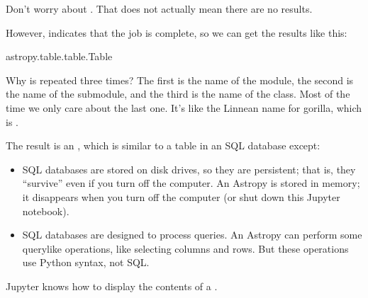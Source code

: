 \documentclass[letterpaper,10pt,english]{sphinxmanual}
\begin{document}
Don’t worry about .  That does not actually mean there are no results.

However,  indicates that the job is complete, so we can get the results like this:

\begin{sphinxVerbatim}[commandchars=\\\{\}]
  
\end{sphinxVerbatim}

\begin{sphinxVerbatim}[commandchars=\\\{\}]
astropy.table.table.Table
\end{sphinxVerbatim}

  Why is  repeated three times?  The first is the name of the module, the second is the name of the submodule, and the third is the name of the class.  Most of the time we only care about the last one.  It’s like the Linnean name for gorilla, which is .

The result is an , which is similar to a table in an SQL database except:
\begin{itemize}
\item {} 
SQL databases are stored on disk drives, so they are persistent; that is, they “survive” even if you turn off the computer.  An Astropy  is stored in memory; it disappears when you turn off the computer (or shut down this Jupyter notebook).

\item {} 
SQL databases are designed to process queries.  An Astropy  can perform some query\sphinxhyphen{}like operations, like selecting columns and rows.  But these operations use Python syntax, not SQL.

\end{itemize}

Jupyter knows how to display the contents of a .

\begin{sphinxVerbatim}[commandchars=\\\{\}]
\end{sphinxVerbatim}
\end{document}
